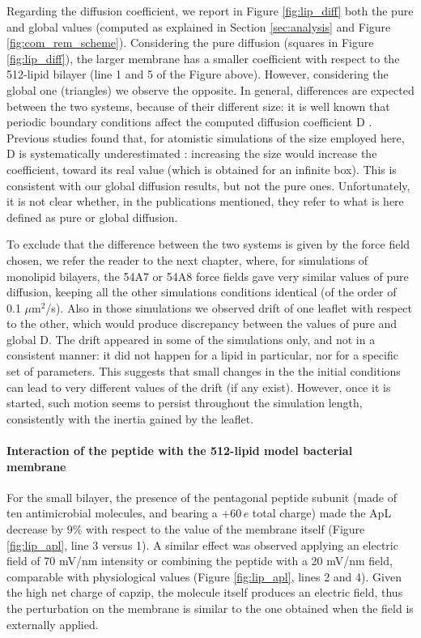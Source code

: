 Regarding the diffusion coefficient, we report in Figure \ref{fig:lip_diff} both the pure and global values (computed as explained in Section \ref{sec:analysis} and Figure \ref{fig:com_rem_scheme}).
%
Considering the pure diffusion (squares in Figure \ref{fig:lip_diff}), the larger membrane has a smaller coefficient with respect to the 512-lipid bilayer (line 1 and 5 of the Figure above). However, considering the global one (triangles) we observe the opposite.
%
In general, differences are expected between the two systems, because of their different size: it is well known that periodic boundary conditions affect the computed diffusion coefficient D \citep{Camley2015,Venable2017}. Previous studies found that, for atomistic simulations of the size employed here, D is systematically underestimated \citep{Camley2015}: increasing the size would increase the coefficient, toward its real value (which is obtained for an infinite box). This is consistent with our global diffusion results, but not the pure ones. Unfortunately, it is not clear whether, in the publications mentioned, they refer to what is here defined as pure or global diffusion.

To exclude that the difference between the two systems is given by the force field chosen, we refer the reader to the next chapter, where, for simulations of monolipid bilayers, the 54A7 or 54A8 force fields gave very similar values of pure diffusion, keeping all the other simulations conditions identical (of the order of 0.1 $\mu$m$^2$/s).
%
Also in those simulations we observed drift of one leaflet with respect to the other, which would produce discrepancy between the values of pure and global D. The drift appeared in some of the simulations only, and not in a consistent manner: it did not happen for a lipid in particular, nor for a specific set of parameters. This suggests that small changes in the the initial conditions can lead to very different values of the drift (if any exist).
However, once it is started, such motion seems to persist throughout the simulation length, consistently with the inertia gained by the leaflet.


\paragraph{Interaction of the peptide with the 512-lipid model bacterial membrane}
For the small bilayer, the presence of the pentagonal peptide subunit (made of ten antimicrobial molecules, and bearing a $+60\,e$ total charge) made the ApL decrease by 9\% with respect to the value of the membrane itself (Figure \ref{fig:lip_apl}, line 3 versus 1).
%
A similar effect was observed applying an electric field of 70 mV/nm intensity or combining the peptide with a 20 mV/nm field, comparable with physiological values (Figure \ref{fig:lip_apl}, lines 2 and 4).
%
Given the high net charge of capzip, the molecule itself produces an electric field, thus the perturbation on the membrane is similar to the one obtained when the field is externally applied.

